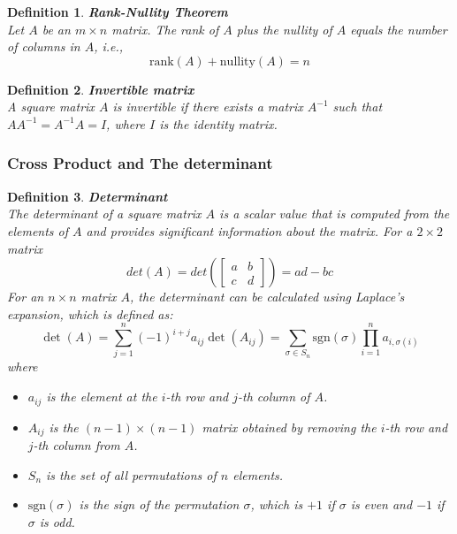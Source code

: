 \documentclass[11pt]{book} %
\newtheorem{definition}{Definition}[section]
\begin{document}
\begin{definition}{\textbf{Rank-Nullity Theorem}} \\
    Let \( A \) be an \( m \times n \) matrix. The rank of \( A \) plus the nullity of \( A \) equals the number of columns in \( A \), i.e., 
    \[
    \text{rank}(A) + \text{nullity}(A) = n
    \]
\end{definition}

\begin{definition}{\textbf{Invertible matrix}} \\
    A square matrix \( A \) is invertible if there exists a matrix \( A^{-1} \) such that \( A A^{-1} = A^{-1} A = I \), where \( I \) is the identity matrix.
\end{definition}

\subsubsection{Cross Product and The determinant}

\begin{definition}{\textbf{Determinant}} \\
    The determinant of a square matrix \( A \) is a scalar value that is computed from the elements of \( A \) and provides significant information about the matrix.     
    For a \( 2 \times 2 \) matrix 
    \[
    det(A) = det( \begin{bmatrix} a & b \\ c & d \end{bmatrix} ) = ad - bc
    \]
    For an \( n \times n \) matrix \( A \), the determinant can be calculated using Laplace's expansion, which is defined as:
    \[
    \det(A) = \sum_{j=1}^{n} (-1)^{i+j} a_{ij} \det(A_{ij}) = \sum_{\sigma \in S_n} \text{sgn}(\sigma) \prod_{i=1}^{n} a_{i, \sigma(i)}
    \]
    where 
    \begin{itemize}
        \item \( a_{ij} \) is the element at the \( i \)-th row and \( j \)-th column of \( A \).
        \item \( A_{ij} \) is the \((n-1) \times (n-1)\) matrix obtained by removing the \( i \)-th row and \( j \)-th column from \( A \).
        \item \( S_n \) is the set of all permutations of \( n \) elements.
        \item \( \text{sgn}(\sigma) \) is the sign of the permutation \( \sigma \), which is \( +1 \) if \( \sigma \) is even and \( -1 \) if \( \sigma \) is odd.
    \end{itemize}
\end{definition}
\end{document}
